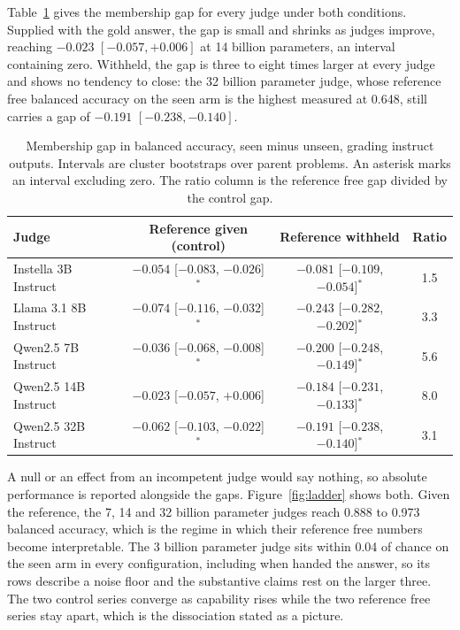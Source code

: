 Table~\ref{tab:main} gives the membership gap for every judge under both conditions.
Supplied with the gold answer, the gap is small and shrinks as judges improve, reaching
$-0.023$ $[-0.057, +0.006]$ at 14 billion parameters, an interval containing zero. Withheld,
the gap is three to eight times larger at every judge and shows no tendency to close: the 32
billion parameter judge, whose reference free balanced accuracy on the seen arm is the
highest measured at 0.648, still carries a gap of $-0.191$ $[-0.238, -0.140]$.

\begin{table}[t]
\centering
\caption{Membership gap in balanced accuracy, seen minus unseen, grading instruct outputs.
Intervals are cluster bootstraps over parent problems. An asterisk marks an interval
excluding zero. The ratio column is the reference free gap divided by the control gap.}
\label{tab:main}
\small
\begin{tabular}{lccc}
\toprule
Judge & Reference given (control) & Reference withheld & Ratio \\
\midrule
Instella 3B Instruct  & $-0.054$ [$-0.083$, $-0.026$]$^{*}$ & $-0.081$ [$-0.109$, $-0.054$]$^{*}$ & 1.5 \\
Llama 3.1 8B Instruct & $-0.074$ [$-0.116$, $-0.032$]$^{*}$ & $\mathbf{-0.243}$ [$-0.282$, $-0.202$]$^{*}$ & 3.3 \\
Qwen2.5 7B Instruct   & $-0.036$ [$-0.068$, $-0.008$]$^{*}$ & $\mathbf{-0.200}$ [$-0.248$, $-0.149$]$^{*}$ & 5.6 \\
Qwen2.5 14B Instruct  & $-0.023$ [$-0.057$, $+0.006$]       & $\mathbf{-0.184}$ [$-0.231$, $-0.133$]$^{*}$ & 8.0 \\
Qwen2.5 32B Instruct  & $-0.062$ [$-0.103$, $-0.022$]$^{*}$ & $\mathbf{-0.191}$ [$-0.238$, $-0.140$]$^{*}$ & 3.1 \\
\bottomrule
\end{tabular}
\end{table}

A null or an effect from an incompetent judge would say nothing, so absolute performance is
reported alongside the gaps. Figure~\ref{fig:ladder} shows both. Given the reference, the 7,
14 and 32 billion parameter judges reach 0.888 to 0.973 balanced accuracy, which is the
regime in which their reference free numbers become interpretable. The 3 billion parameter
judge sits within 0.04 of chance on the seen arm in every configuration, including when
handed the answer, so its rows describe a noise floor and the substantive claims rest on the
larger three. The two control series converge as capability rises while the two reference
free series stay apart, which is the dissociation stated as a picture.

